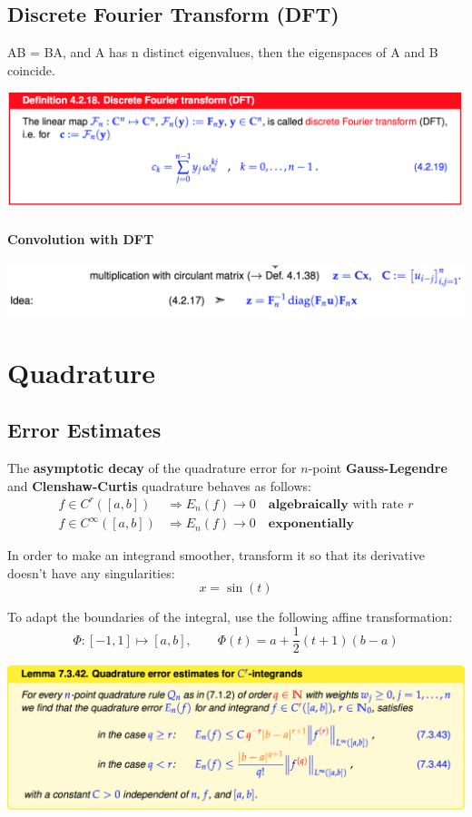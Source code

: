 \documentclass[12pt, a4paper]{article}
\begin{document}
\subsection{Discrete Fourier Transform (DFT)}
AB = BA, and A has n distinct eigenvalues, then the eigenspaces of A and B coincide.
\begin{center}
	\includegraphics[width=380pt]{dft.png}
\end{center}
\paragraph{Convolution with DFT}
\begin{center}
	\includegraphics[width=380pt]{convDFT.png}
\end{center}

\section{Quadrature}

\subsection{Error Estimates}

The \textbf{asymptotic decay} of the quadrature error for $n$-point \textbf{Gauss-Legendre} and \textbf{Clenshaw-Curtis} quadrature behaves as follows:
\begin{equation*}
\begin{split}
	f \in C^r([a,b]) & \Rightarrow E_n(f) \rightarrow 0 \quad\textbf{algebraically}\text{ with rate $r$} \\
	f \in C^\infty([a,b]) & \Rightarrow E_n(f) \rightarrow 0 \quad\textbf{exponentially}
\end{split}
\end{equation*}

In order to make an integrand smoother, transform it so that its derivative doesn't have any singularities:
\begin{equation*}
	x = \sin(t)
\end{equation*}

To adapt the boundaries of the integral, use the following affine transformation:
\begin{equation*}
	\Phi: [-1, 1] \mapsto [a, b], \qquad \Phi(t) = a + \frac{1}{2}(t + 1)(b -a)
\end{equation*}

\begin{center}
	\includegraphics[width=380pt]{quadrature_error}
\end{center}
\end{document}
